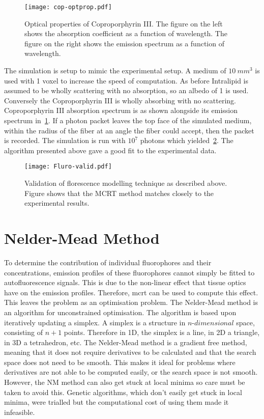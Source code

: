 \begin{figure}[!htpb]
	\centering
	\texttt{[image: cop-optprop.pdf]}
	\caption{Optical properties of Coproporphyrin III. The figure on the left shows the absorption coefficient as a function of wavelength. The figure on the right shows the emission spectrum as a function of wavelength.}
	\label{fig:coporiii}
\end{figure}

The simulation is setup to mimic the experimental setup.
A medium of $10~mm^3$ is used with 1 voxel to increase the speed of computation.
As before Intralipid is assumed to be wholly scattering with no absorption, so an albedo of 1 is used.
Conversely the Coproporphyrin III is wholly absorbing with no scattering.
Coproporphyrin III absorption spectrum is as shown alongside its emission spectrum in~\cref{fig:coporiii}.
If a photon packet leaves the top face of the simulated medium, within the radius of the fiber at an angle the fiber could accept, then the packet is recorded.
The simulation is run with $10^7$ photons which yielded~\cref{fig:flurovalid}.
The algorithm presented above gave a good fit to the experimental data.

\begin{figure}[!htpb]
  \centering
  \texttt{[image: Fluro-valid.pdf]}
  \caption{Validation of florescence modelling technique as described above. Figure shows that the MCRT method matches closely to the experimental results.}
  \label{fig:flurovalid}
\end{figure}

\FloatBarrier

\section{Nelder-Mead Method}

To determine the contribution of individual fluorophores and their concentrations, emission profiles of these fluorophores cannot simply be fitted to autofluorescence signals.
This is due to the non-linear effect that tissue optics have on the emission profiles.
Therefore, \gls*{mcrt} can be used to compute this effect.
This leaves the problem as an optimisation problem.
The Nelder-Mead method is an algorithm for unconstrained optimisation. 
The algorithm is based upon iteratively updating a simplex. 
A simplex is a structure in $n$-$dimensional$ space, consisting of $n+1$ points. 
Therefore in 1D, the simplex is a line, in 2D a triangle, in 3D a tetrahedron, etc. 
The Nelder-Mead method is a gradient free method, meaning that it does not require derivatives to be calculated and that the search space does not need to be smooth.
This makes it ideal for problems where derivatives are not able to be computed easily, or the search space is not smooth.
However, the NM method can also get stuck at local minima so care must be taken to avoid this.
Genetic algorithms, which don't easily get stuck in local minima, were trialled but the computational cost of using them made it infeasible. 

